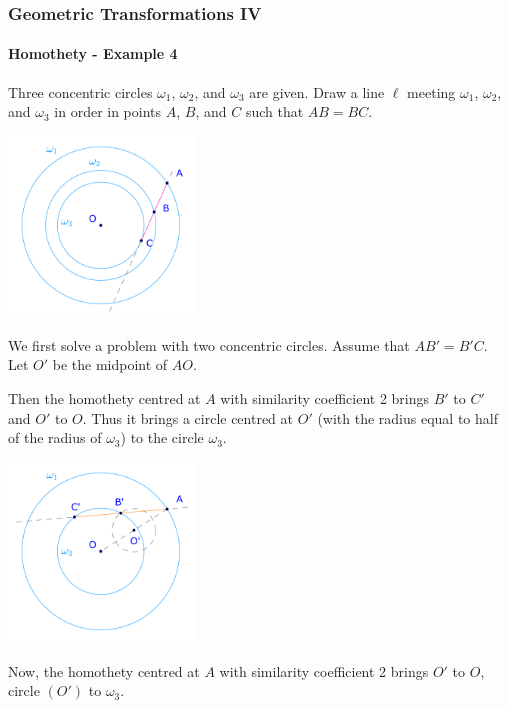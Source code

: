 \documentclass[8pt,xcolor=table,dvipsnames]{beamer}
\begin{document}
\begin{frame}[t]
    \frametitle{Geometric Transformations IV}
    \framesubtitle{Homothety - Example 4}
    \begin{overprint}
        \begin{example}
            Three concentric circles $\omega_1$, $\omega_2$, and $\omega_3$ are given.
            \bigbreak
            Draw a line $\ell$ meeting $\omega_1$, $\omega_2$, and $\omega_3$ in order in points $A$, $B$, and $C$ such that $AB = BC.$
        \end{example}
        \begin{center}
            \includegraphics[width=5cm]{./svg/pdf/homothety-p4a.pdf}
        \end{center}
        We first solve a problem with two concentric circles.
        Assume that $AB'=B'C.$ Let $O'$ be the midpoint of $AO.$

        \bigbreak
        Then the homothety centred at $A$ with similarity coefficient 2 brings $B'$ to $C'$ and $O'$ to $O.$
        Thus it brings a circle centred at $O'$ (with the radius equal to half of the radius of $\omega_3$) to the circle $\omega_3$.
        \begin{center}
            \includegraphics[width=5cm]{./svg/pdf/homothety-p4b.pdf}
        \end{center}
        Now, the homothety centred at $A$ with similarity coefficient 2 brings $O'$ to $O$, circle $(O')$ to $\omega_3$.


\end{overprint}
\end{frame}
\end{document}
